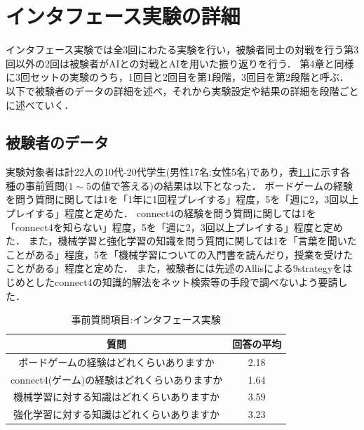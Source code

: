\chapter{インタフェース実験の詳細}
\label{chap:system}
インタフェース実験では全3回にわたる実験を行い，被験者同士の対戦を行う第3回以外の2回は被験者がAIとの対戦とAIを用いた振り返りを行う．
第4章と同様に3回セットの実験のうち，1回目と2回目を第1段階，3回目を第2段階と呼ぶ．
以下で被験者のデータの詳細を述べ，それから実験設定や結果の詳細を段階ごとに述べていく．
\section{被験者のデータ}
実験対象者は計22人の10代-20代学生(男性17名:女性5名)であり，表\ref{table:before}に示す各種の事前質問($1\sim5$の値で答える)の結果は以下となった．
ボードゲームの経験を問う質問に関しては1を「1年に1回程プレイする」程度，5を「週に2，3回以上プレイする」程度と定めた．
connect4の経験を問う質問に関しては1を「connect4を知らない」程度，5を「週に2，3回以上プレイする」程度と定めた．
また，機械学習と強化学習の知識を問う質問に関しては1を「言葉を聞いたことがある」程度，5を「機械学習についての入門書を読んだり，授業を受けたことがある」程度と定めた．
また，被験者には先述のAllis\cite{allis}による9strategyをはじめとしたconnect4の知識的解法をネット検索等の手段で調べないよう要請した．
\begin{table}[H]
    \caption{事前質問項目:インタフェース実験}
    \label{table:before}
	\small
    \begin{tabular}{c||c}
        \multicolumn{1}{c}{質問} & 回答の平均\\ \hline \hline
        ボードゲームの経験はどれくらいありますか & 2.18\\
        connect4(ゲーム)の経験はどれくらいありますか& 1.64\\\hline
        機械学習に対する知識はどれくらいありますか& 3.59\\
        強化学習に対する知識はどれくらいありますか& 3.23\\
    \end{tabular}
    
\end{table}
